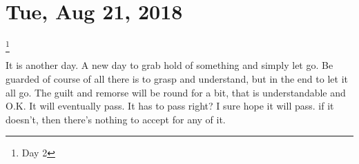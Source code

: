 \section{Tue, Aug 21, 2018}\footnote{Day 2}

It is another day. A new day to grab hold of something and simply let go. Be guarded
of course of all there is to grasp and understand, but in the end to let it all go.
The guilt and remorse will be round for a bit, that is understandable and O.K. It
will eventually pass. It has to pass right? I sure hope it will pass. if it doesn't,
then there's nothing to accept for any of it.
